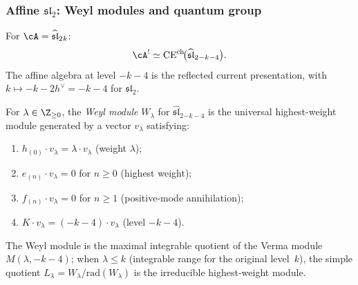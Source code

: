 \subsubsection{Affine $\mathfrak{sl}_2$: Weyl modules and quantum group}

For $\cA=\widehat{\mathfrak{sl}}_2{}_k$:
\[
\cA^!\simeq
\operatorname{CE}^{\mathrm{ch}}\!\bigl(\widehat{\mathfrak{sl}}_2{}_{-k-4}\bigr).
\]
The affine algebra at level $-k-4$ is the reflected current
presentation, with $k\mapsto -k-2h^\vee=-k-4$ for $\mathfrak{sl}_2$.

\begin{definition}
For $\lambda\in\Z_{\ge 0}$, the \emph{Weyl module}
$W_\lambda$ for $\widehat{\mathfrak{sl}}_2{}_{-k-4}$
is the universal highest-weight module generated by a
vector $v_\lambda$ satisfying:
\begin{enumerate}[label=(\roman*)]
\item $h_{(0)}\cdot v_\lambda=\lambda\cdot v_\lambda$
 (weight $\lambda$);
\item $e_{(n)}\cdot v_\lambda=0$ for $n\ge 0$
 (highest weight);
\item $f_{(n)}\cdot v_\lambda=0$ for $n\ge 1$
 (positive-mode annihilation);
\item $K\cdot v_\lambda=(-k-4)\cdot v_\lambda$
 (level $-k-4$).
\end{enumerate}
The Weyl module is the maximal integrable quotient of the
Verma module $M(\lambda,-k-4)$; when $\lambda\le k$
(integrable range for the original level~$k$), the
simple quotient $L_\lambda=W_\lambda/\mathrm{rad}(W_\lambda)$
is the irreducible highest-weight module.
\end{definition}

